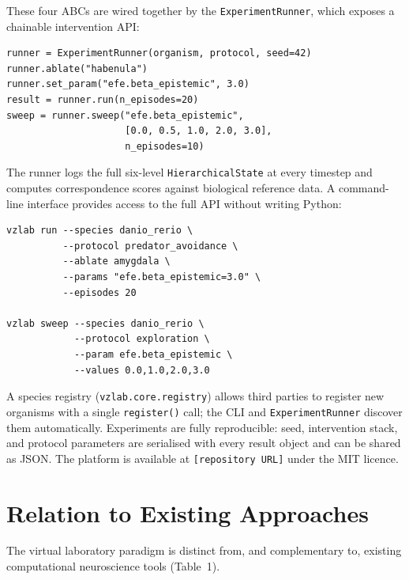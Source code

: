 \documentclass[12pt,a4paper]{article}
\begin{document}
These four ABCs are wired together by the \texttt{ExperimentRunner},
which exposes a chainable intervention API:

\medskip
\begin{verbatim}
runner = ExperimentRunner(organism, protocol, seed=42)
runner.ablate("habenula")
runner.set_param("efe.beta_epistemic", 3.0)
result = runner.run(n_episodes=20)
sweep = runner.sweep("efe.beta_epistemic",
                     [0.0, 0.5, 1.0, 2.0, 3.0],
                     n_episodes=10)
\end{verbatim}
\medskip

\noindent The runner logs the full six-level \texttt{HierarchicalState}
at every timestep and computes correspondence scores against biological
reference data.
A command-line interface provides access to the full API without
writing Python:

\medskip
\begin{verbatim}
vzlab run --species danio_rerio \
          --protocol predator_avoidance \
          --ablate amygdala \
          --params "efe.beta_epistemic=3.0" \
          --episodes 20

vzlab sweep --species danio_rerio \
            --protocol exploration \
            --param efe.beta_epistemic \
            --values 0.0,1.0,2.0,3.0
\end{verbatim}
\medskip

\noindent A species registry (\texttt{vzlab.core.registry}) allows
third parties to register new organisms with a single
\texttt{register()} call; the CLI and \texttt{ExperimentRunner}
discover them automatically.
Experiments are fully reproducible: seed, intervention stack, and
protocol parameters are serialised with every result object and can
be shared as JSON.
The platform is available at \texttt{[repository URL]} under the
MIT licence.


\section*{Relation to Existing Approaches}

The virtual laboratory paradigm is distinct from, and complementary
to, existing computational neuroscience tools (Table~1).
\end{document}

